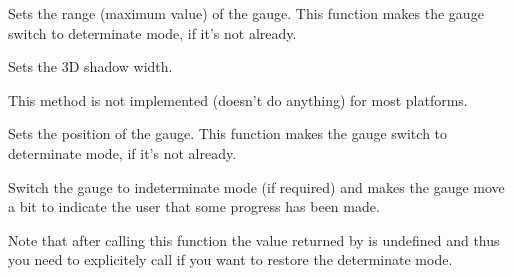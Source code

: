 


\label{wxgaugesetrange}


Sets the range (maximum value) of the gauge.
This function makes the gauge switch to determinate mode, if it's not already.




\label{wxgaugesetshadowwidth}


Sets the 3D shadow width.


This method is not implemented (doesn't do anything) for most platforms.


\label{wxgaugesetvalue}


Sets the position of the gauge.
This function makes the gauge switch to determinate mode, if it's not already.






\label{wxgaugepulse}


Switch the gauge to indeterminate mode (if required) and makes the gauge move
a bit to indicate the user that some progress has been made.

Note that after calling this function the value returned by 
is undefined and thus you need to explicitely call  if you
want to restore the determinate mode.
